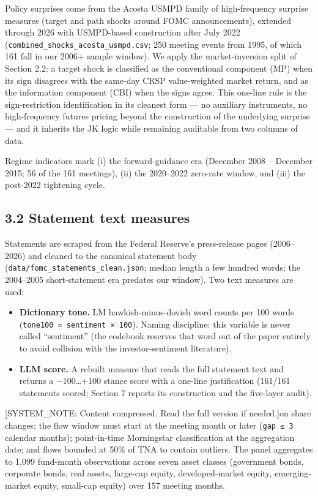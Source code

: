 Policy surprises come from the Acosta USMPD family of high-frequency surprise measures (target and path shocks around FOMC announcements), extended through 2026 with USMPD-based construction after July 2022 (\texttt{combined\_shocks\_acosta\_usmpd.csv}; 250 meeting events from 1995, of which 161 fall in our 2006+ sample window). We apply the market-inversion split of Section 2.2: a target shock is classified as the conventional component (MP) when its sign disagrees with the same-day CRSP value-weighted market return, and as the information component (CBI) when the signs agree. This one-line rule is the sign-restriction identification in its cleanest form --- no auxiliary instruments, no high-frequency futures pricing beyond the construction of the underlying surprise --- and it inherits the JK logic while remaining auditable from two columns of data.

Regime indicators mark (i) the forward-guidance era (December 2008 -- December 2015; 56 of the 161 meetings), (ii) the 2020--2022 zero-rate window, and (iii) the post-2022 tightening cycle.

\subsection{3.2 Statement text measures}\label{statement-text-measures}

Statements are scraped from the Federal Reserve's press-release pages (2006--2026) and cleaned to the canonical statement body (\texttt{data/fomc\_statements\_clean.json}; median length a few hundred words; the 2004--2005 short-statement era predates our window). Two text measures are used:

\begin{itemize}
\tightlist
\item
  \textbf{Dictionary tone.} LM hawkish-minus-dovish word counts per 100 words (\texttt{tone100\ =\ sentiment\ ×\ 100}). Naming discipline: this variable is never called ``sentiment'' (the codebook reserves that word out of the paper entirely to avoid collision with the investor-sentiment literature).
\item
  \textbf{LLM score.} A rebuilt measure that reads the full statement text and returns a −100\ldots+100 stance score with a one-line justification (161/161 statements scored; Section 7 reports its construction and the five-layer audit).
\end{itemize}

{[}SYSTEM\_NOTE: Content compressed. Read the full version if needed.{]}on share changes; the flow window must start at the meeting month or later (\texttt{gap\ ≤\ 3} calendar months); point-in-time Morningstar classification at the aggregation date; and flows bounded at 50\% of TNA to contain outliers. The panel aggregates to 1,099 fund-month observations across seven asset classes (government bonds, corporate bonds, real assets, large-cap equity, developed-market equity, emerging-market equity, small-cap equity) over 157 meeting months.

